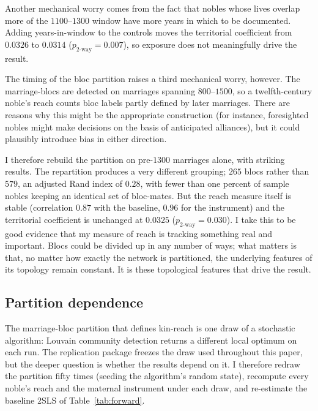 \documentclass[12pt]{article}
\theoremstyle{definition}
\theoremstyle{remark}
\begin{document}


Another mechanical worry comes from the fact that nobles whose lives overlap more of the $1100$--$1300$ window have more years in which to be documented. Adding years-in-window to the controls moves the territorial coefficient from $0.0326$ to $0.0314$ ($p_{\text{2-way}}=0.007$), so exposure does not meaningfully drive the result.

The timing of the bloc partition raises a third mechanical worry, however. The marriage-blocs are detected on marriages spanning $800$--$1500$, so a twelfth-century noble's reach counts bloc labels partly defined by later marriages. There are reasons why this might be the appropriate construction (for instance, foresighted nobles might make decisions on the basis of anticipated alliances), but it could plausibly introduce bias in either direction.

I therefore rebuild the partition on pre-$1300$ marriages alone, with striking results. The repartition produces a very different grouping; $265$ blocs rather than $579$, an adjusted Rand index of $0.28$, with fewer than one percent of sample nobles keeping an identical set of bloc-mates. But the reach measure itself is stable (correlation $0.87$ with the baseline, $0.96$ for the instrument) and the territorial coefficient is unchanged at $0.0325$ ($p_{\text{2-way}}=0.030$). I take this to be good evidence that my measure of reach is tracking something real and important. Blocs could be divided up in any number of ways; what matters is that, no matter how exactly the network is partitioned, the underlying features of its topology remain constant. It is these topological features that drive the result.

\subsection{Partition dependence}
\label{app:partition}

The marriage-bloc partition that defines kin-reach is one draw of a
stochastic algorithm: Louvain community detection returns a different local
optimum on each run. The replication package freezes the draw used
throughout this paper, but the deeper question is whether the results
depend on it. I therefore redraw the partition fifty times (seeding the
algorithm's random state), recompute every noble's reach and the maternal
instrument under each draw, and re-estimate the baseline 2SLS of
Table~\ref{tab:forward}.
\end{document}
